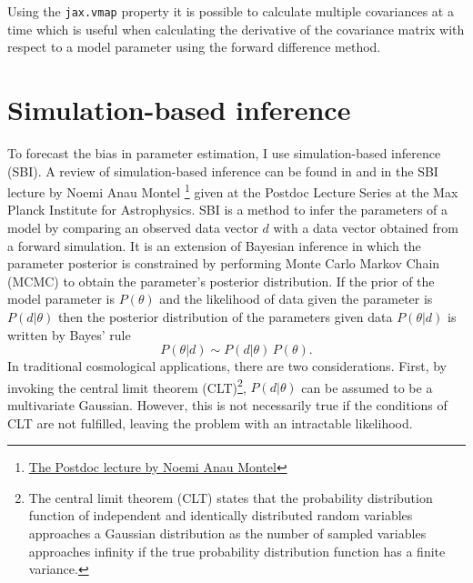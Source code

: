 Using the \texttt{jax.vmap} property it is possible to calculate multiple covariances at a time which is useful when calculating the derivative of the covariance matrix with respect to a model parameter using the forward difference method.

\section{Simulation-based inference} \label{meth_sec:sbi}
To forecast the bias in parameter estimation, I use simulation-based inference (SBI). A review of simulation-based inference can be found in \citet{cranmer2020frontier} and in the SBI lecture by Noemi Anau Montel \footnote{\href{https://wwwmpa.mpa-garching.mpg.de/~komatsu/lecturenotes/Noemi_Anau_Montel_on_SBI.pdf}{The Postdoc lecture by Noemi Anau Montel}} given at the Postdoc Lecture Series at the Max Planck Institute for Astrophysics. SBI is a method to infer the parameters of a model by comparing an observed data vector $d$ with a data vector obtained from a forward simulation. It is an extension of Bayesian inference in which the parameter posterior is constrained by performing Monte Carlo Markov Chain (MCMC) to obtain the parameter's posterior distribution. If the prior of the model parameter is $P(\theta)$ and the likelihood of data given the parameter is $P(d|\theta)$ then the posterior distribution of the parameters given data $P(\theta|d)$ is written by Bayes' rule
\begin{equation}
    P(\theta|d) \sim P(d|\theta) \, P(\theta).
\end{equation}
In traditional cosmological applications, there are two considerations. First, by invoking the central limit theorem (CLT)\footnote{The central limit theorem (CLT) states that the probability distribution function of independent and identically distributed random variables approaches a Gaussian distribution as the number of sampled variables approaches infinity if the true probability distribution function has a finite variance.}, $P(d|\theta)$ can be assumed to be a multivariate Gaussian. However, this is not necessarily true if the conditions of CLT are not fulfilled, leaving the problem with an intractable likelihood.


